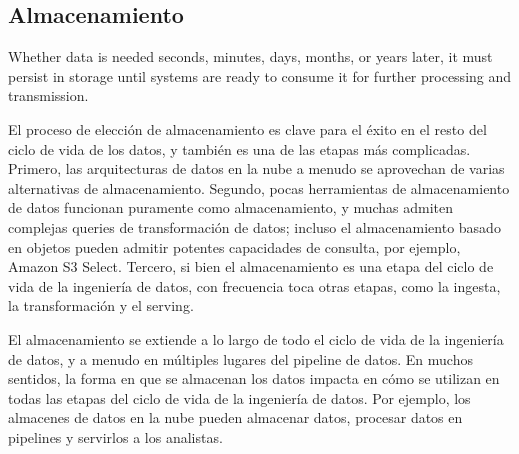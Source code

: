 \documentclass[12pt]{book}
\begin{document}
\subsection{Almacenamiento}
Whether data is needed seconds, minutes, days, months, or years later, it must persist in storage until systems are ready to consume it for further processing and transmission.

El proceso de elección de almacenamiento es clave para el éxito en el resto del ciclo de vida de los datos, y también es una de las etapas más complicadas. 
Primero, las arquitecturas de datos en la nube a menudo se aprovechan de varias alternativas de almacenamiento. 
Segundo, pocas herramientas de almacenamiento de datos funcionan puramente como almacenamiento, y muchas admiten complejas queries de transformación de datos; incluso el almacenamiento basado en objetos pueden admitir potentes capacidades de consulta, por ejemplo, Amazon S3 Select. 
Tercero, si bien el almacenamiento es una etapa del ciclo de vida de la ingeniería de datos, con frecuencia toca otras etapas, como la ingesta, la transformación y el serving.

El almacenamiento se extiende a lo largo de todo el ciclo de vida de la ingeniería de datos, y a menudo en múltiples lugares del pipeline de datos. En muchos sentidos, la forma en que se almacenan los datos impacta en cómo se utilizan en todas las etapas del ciclo de vida de la ingeniería de datos. Por ejemplo, los almacenes de datos en la nube pueden almacenar datos, procesar datos en pipelines y servirlos a los analistas. 
\end{document}
